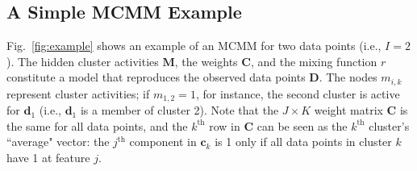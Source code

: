 
\subsection{A Simple MCMM Example}
\label{subsec:example}

Fig.~\ref{fig:example} shows an example of an MCMM for two data points (i.e., $I = 2$).
The hidden cluster activities $\mathbf{M}$, the weights $\mathbf{C}$,
and the mixing function $r$ constitute a model that reproduces the
observed data points $\mathbf{D}$.
%
%
The nodes $m_{i,k}$ represent cluster activities; if $m_{1,2} = 1$,
for instance, the second cluster is active for $\mathbf{d}_1$ (i.e.,
$\mathbf{d}_1$ is a member of cluster 2).
%
Note that the $J \times K$ weight matrix $\mathbf{C}$ is the same for
all data points, and
%
%
the $k^{\text{th}}$ row in $\mathbf{C}$ can be seen as the $k^{\text{th}}$
cluster's ``average" vector: the $j^{\text{th}}$ component in
$\mathbf{c}_k$ is 1 only if all data points in cluster $k$ have
1 at feature $j$.
%

